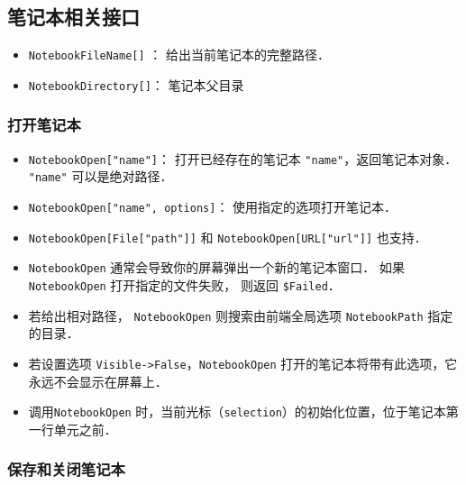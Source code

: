 \subsection{笔记本相关接口}

\begin{itemize}
\item \verb`NotebookFileName[]` ： 给出当前笔记本的完整路径．
\item \verb`NotebookDirectory[]`： 笔记本父目录
\end{itemize}

\subsubsection{打开笔记本}

\begin{itemize}
\item \verb`NotebookOpen["name"]`：  打开已经存在的笔记本 \verb`"name"`，返回笔记本对象． \verb`"name"` 可以是绝对路径．
\item \verb`NotebookOpen["name", options]`： 使用指定的选项打开笔记本．
\item \verb`NotebookOpen[File["path"]]` 和 \verb`NotebookOpen[URL["url"]]` 也支持．
\item \verb`NotebookOpen` 通常会导致你的屏幕弹出一个新的笔记本窗口．
如果 \verb`NotebookOpen` 打开指定的文件失败， 则返回 \verb`$Failed`．
\item 若给出相对路径， \verb`NotebookOpen` 则搜索由前端全局选项 \verb`NotebookPath` 指定的目录．
\item 若设置选项 \verb`Visible->False`，\verb`NotebookOpen` 打开的笔记本将带有此选项，它永远不会显示在屏幕上．
\item 调用\verb`NotebookOpen` 时，当前光标（\verb`selection`）的初始化位置，位于笔记本第一行单元之前．
\end{itemize}

\subsubsection{保存和关闭笔记本}

